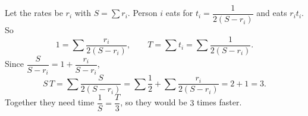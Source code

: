 Let the rates be $r_i$ with $S=\sum r_i$. Person $i$ eats for $t_i=\dfrac1{2(S-r_i)}$ and eats $r_it_i$. So
\[1=\sum\dfrac{r_i}{2(S-r_i)},\qquad T=\sum t_i=\sum\dfrac1{2(S-r_i)}.\]
Since $\dfrac{S}{S-r_i}=1+\dfrac{r_i}{S-r_i}$,
\[S\,T=\sum\dfrac{S}{2(S-r_i)}=\sum\dfrac12+\sum\dfrac{r_i}{2(S-r_i)}=2+1=3.\]
Together they need time $\dfrac1S=\dfrac T3$, so they would be $\boxed{3}$ times faster.
